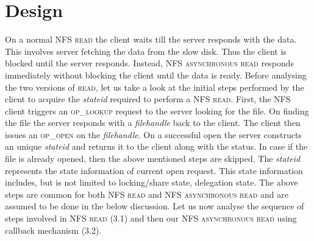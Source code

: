 \section{Design}

\label{Design}
On a normal \textsc{NFS read} the client waits till the server responds with the data. This involves server fetching the data from the slow disk. Thus the client is blocked until the server responds. Instead, \textsc{NFS asynchronous read} responds immediately without blocking the client until the data is ready. Before analysing the two versions of \textsc{read}, let us take a look at the initial steps performed by the client to acquire the \textit{stateid} required to perform a \textsc{NFS read}. First, the NFS client triggers an \textsc{op\_lookup} request to the server looking for the file. On finding the file the server responds with a \textit{filehandle} back to the client. The client then issues an \textsc{op\_open} on the \textit{filehandle}. On a successful open the server constructs an unique \textit{stateid} and returns it to the client along with the status. In case if the file is already opened, then the above mentioned steps are skipped. The \textit{stateid} represents the state information of current open request. This state information includes, but is not limited to locking/share state, delegation state. The above steps are common for both \textsc{NFS read} and \textsc{NFS asynchronous read} and are assumed to be done in the below discussion. Let us now analyse the sequence of steps involved in \textsc{NFS read} (3.1) and then our \textsc{NFS asynchronous read} using callback mechanism (3.2).

